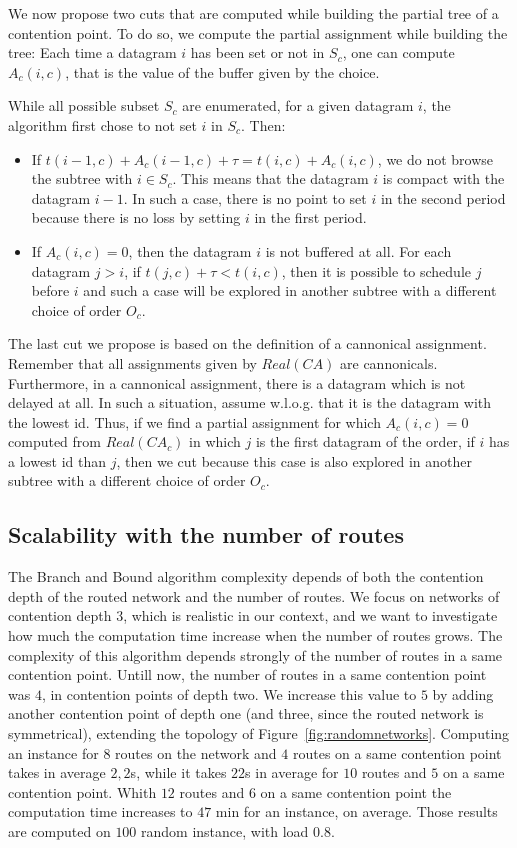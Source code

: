 We now propose two cuts that are computed while building the partial tree of a contention point. To do so, we compute the partial assignment while building the tree: Each time a datagram $i$ has been set or not in $S_c$, one can compute $A_{c}(i,c)$, that is the value of the buffer given by the choice.

While all possible subset $S_c$ are enumerated, for a given datagram $i$, the algorithm first chose to not set $i$ in $S_c$. Then:
\begin{itemize}
 \item If $t(i-1,c) + A_{c}(i-1,c) + \tau = t(i,c) + A_{c}(i,c)$, we do not browse the subtree with $i \in S_c$. This means that the datagram $i$ is compact with the datagram $i-1$. In such a case, there is no point to set $i$ in the second period because there is no loss by setting $i$ in the first period.

\item If $A_{c}(i,c) = 0$, then the datagram $i$ is not buffered at all. For each datagram $j>i$, if $t(j,c) + \tau < t(i,c)$, then it is possible to schedule $j$ before $i$ and such a case will be explored in another subtree with a different choice of order $O_c$.

\end{itemize}


The last cut we propose is based on the definition of a cannonical assignment. Remember that all assignments given by $Real(CA)$ are cannonicals. Furthermore, in a cannonical assignment, there is a datagram which is not delayed at all. In such a situation, assume w.l.o.g. that it is the datagram with the lowest id. Thus, if we find a partial assignment for which $A_{c}(i,c) = 0$ computed from $Real(CA_c)$ in which $j$ is the first datagram of the order, if $i$ has a lowest id than $j$, then we cut because this case is also explored in another subtree with a different choice of order $O_c$.

\subsection{Scalability with the number of routes}

The Branch and Bound algorithm complexity depends of both the contention depth of the routed network and the number of routes. We focus on networks of contention depth $3$, which is realistic in our context, and we want to investigate how much the computation time increase when the number of routes grows. The complexity of this algorithm depends strongly of the number of routes in a same contention point. Untill now, the number of routes in a same contention point was $4$, in contention points of depth two. We increase this value to $5$ by adding another contention point of depth one (and three, since the routed network is symmetrical), extending the topology of Figure~\ref{fig:randomnetworks}. Computing an instance for $8$ routes on the network and $4$ routes on a same contention point takes in average $2,2$s, while it takes $22$s in average for $10$ routes and $5$ on a same contention point. Whith $12$ routes and $6$ on a same contention point the computation time increases to $47$ min for an instance, on average. Those results are computed on $100$ random instance, with load $0.8$.


